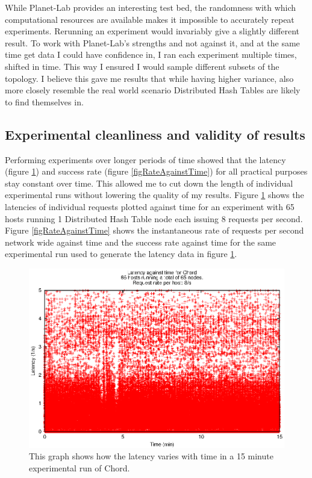 While Planet-Lab provides an interesting test bed, the randomness with which computational resources are available makes it impossible to accurately repeat experiments. Rerunning an experiment would invariably give a slightly different result.
To work with Planet-Lab's strengths and not against it, and at the same time get data I could have confidence in, I ran each experiment multiple times, shifted in time. This way I ensured I would sample different subsets of the topology. I believe this gave me results that while having higher variance, also more closely resemble the real world scenario Distributed Hash Tables are likely to find themselves in.

\subsection{Experimental cleanliness and validity of results}
Performing experiments over longer periods of time showed that the latency (figure \ref{figLatencyAgainstTime}) and success rate (figure \ref{figRateAgainstTime}) for all practical purposes stay constant over time.
This allowed me to cut down the length of individual experimental runs without lowering the quality of my results.
Figure \ref{figLatencyAgainstTime} shows the latencies of individual requests plotted against time for an experiment with 65 hosts running 1 Distributed Hash Table node each issuing 8 requests per second.
Figure \ref{figRateAgainstTime} shows the instantaneous rate of requests per second network wide against time and the success rate against time for the same experimental run used to generate the latency data in figure \ref{figLatencyAgainstTime}. 

\begin{figure}[!htbp]
  \begin{center}
    \includegraphics[width=0.9\linewidth]{illustrations/latency_aginst_time_chord.eps}
    \caption{This graph shows how the latency varies with time in a 15 minute experimental run of Chord.}
    \label{figLatencyAgainstTime}
  \end{center}
\end{figure}

